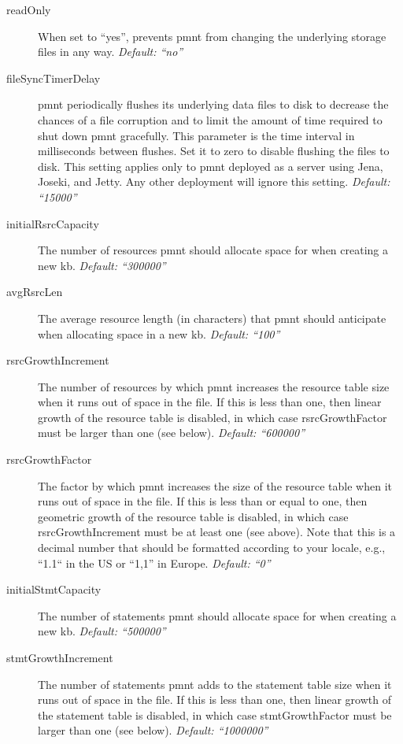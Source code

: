 \begin{description}
	\item[readOnly] When set to ``yes'', prevents \ac{pmnt} from changing the underlying storage files in any way. \emph{Default: ``no''}

	\item[fileSyncTimerDelay] \ac{pmnt} periodically flushes its underlying data files to disk to decrease the chances of a file corruption and to limit the amount of time required to shut down \ac{pmnt} gracefully.  This parameter is the time interval in milliseconds between flushes.  Set it to zero to disable flushing the files to disk.  This setting applies only to \ac{pmnt} deployed as a server using Jena, Joseki, and Jetty.  Any other deployment will ignore this setting. \emph{Default: ``15000''}

	\item[initialRsrcCapacity] The number of resources \ac{pmnt} should allocate space for when creating a new \ac{kb}. \emph{Default: ``300000''}

	\item[avgRsrcLen] The average resource length (in characters) that \ac{pmnt} should anticipate when allocating space in a new \ac{kb}. \emph{Default: ``100''}

	\item[rsrcGrowthIncrement] The number of resources by which \ac{pmnt} increases the resource table size when it runs out of space in the file.  If this is less than one, then linear growth of the resource table is disabled, in which case rsrcGrowthFactor must be larger than one (see below). \emph{Default: ``600000''}

	\item[rsrcGrowthFactor] The factor by which \ac{pmnt} increases the size of the resource table when it runs out of space in the file.  If this is less than or equal to one, then geometric growth of the resource table is disabled, in which case rsrcGrowthIncrement must be at least one (see above).  Note that this is a decimal number that should be formatted according to your locale, e.g., ``1.1`` in the US or ``1,1'' in Europe. \emph{Default: ``0''}

	\item[initialStmtCapacity] The number of statements \ac{pmnt} should allocate space for when creating a new \ac{kb}. \emph{Default: ``500000''}

	\item[stmtGrowthIncrement] The number of statements \ac{pmnt} adds to the statement table size when it runs out of space in the file.  If this is less than one, then linear growth of the statement table is disabled, in which case stmtGrowthFactor must be larger than one (see below). \emph{Default: ``1000000''}


\end{description}

